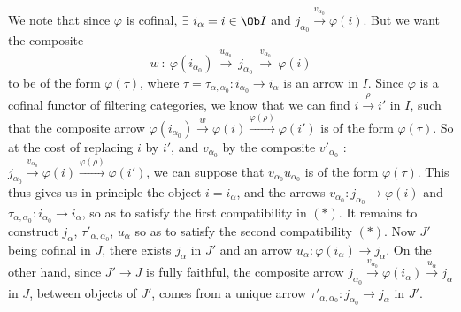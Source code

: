 We note that since $\varphi$ is cofinal, $\exists\ i_\alpha=i\in\Ob I$ and $j_{\alpha_0}\xrightarrow{v_{\alpha_0}}\varphi(i)$. But we want the composite
\[
w\ :\ \varphi(i_{\alpha_0})\ \xrightarrow{u_{\alpha_0}}\ j_{\alpha_0}\ \xrightarrow{v_{\alpha_0}}\ \varphi(i)
\]
to be of the form $\varphi(\tau)$, where $\tau=\tau_{\alpha,\alpha_0}:i_{\alpha_0}\longrightarrow i_\alpha$ is an arrow in $I$. Since $\varphi$ is a cofinal functor of filtering categories, we know
that we can find $i\xrightarrow{\rho}i'$ in $I$, such that the composite arrow $\varphi(i_{\alpha_0})\xrightarrow{w}\varphi(i)\xrightarrow{\varphi(\rho)}\varphi(i')$ is of the form $\varphi(\tau)$. So at the cost of replacing $i$ by $i'$, and $v_{\alpha_0}$ by the composite $v'_{\alpha_0}$ : $j_{\alpha_0}\xrightarrow{v_{\alpha_0}}\varphi(i)\xrightarrow{\varphi(\rho)}\varphi(i')$, we can suppose that $v_{\alpha_0}u_{\alpha_0}$ is of the form $\varphi(\tau)$. This thus gives us in principle the object $i=i_\alpha$, and the arrows $v_{\alpha_0}:j_{\alpha_0}\longrightarrow\varphi(i)$ and $\tau_{\alpha,\alpha_0}:i_{\alpha_0}\longrightarrow i_\alpha$, so as to satisfy the first compatibility in $(*)$. It remains to construct $j_\alpha$, $\tau'_{\alpha,\alpha_0}$, $u_\alpha$ so as to satisfy the second compatibility $(*)$. Now $J'$ being cofinal in $J$, there exists $j_\alpha$ in $J'$ and an arrow $u_\alpha:\varphi(i_\alpha)\longrightarrow j_\alpha$. On the other hand, since $J'\longrightarrow J$ is fully faithful, the composite arrow $j_{\alpha_0}\xrightarrow{v_{\alpha_0}}\varphi(i_\alpha)\xrightarrow{u_\alpha}j_\alpha$ in $J$, between objects of $J'$, comes from a unique arrow $\tau'_{\alpha,\alpha_0}:j_{\alpha_0}\longrightarrow j_\alpha$ in $J'$.


